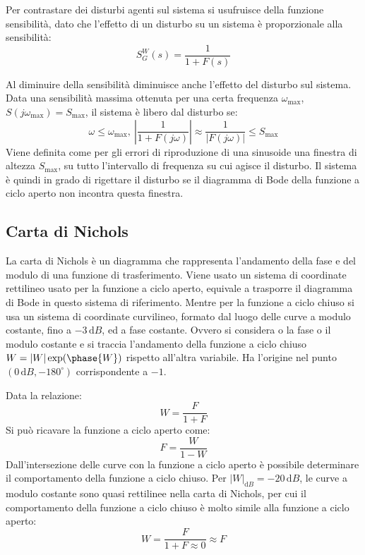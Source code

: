 \documentclass{article}
\numberwithin{equation}{subsection}
\newcommand{\df}{\mathrm{d}}
\begin{document}
 
Per contrastare dei disturbi agenti sul sistema si usufruisce della funzione sensibilità, dato che l'effetto di un disturbo su un sistema è proporzionale alla sensibilità:
\begin{equation*}
    S^W_G(s)=\displaystyle\frac{1}{1+F(s)}
\end{equation*}

Al diminuire della sensibilità diminuisce anche l'effetto del disturbo sul sistema. Data una sensibilità massima ottenuta per una certa frequenza $\omega_{\max}$, 
$S(j\omega_{\max})=S_{\max}$, il sistema è libero dal disturbo se: 
\begin{equation*}
    \omega\leq\omega_{\max},\:\displaystyle\left|\frac{1}{1+F(j\omega)}\right|\approx\frac{1}{|F(j\omega)|}\leq S_{\max}
\end{equation*}
Viene definita come per gli errori di riproduzione di una sinusoide una finestra di altezza $S_{\max}$, su tutto l'intervallo di frequenza su cui agisce il disturbo. Il sistema 
è quindi in grado di rigettare il disturbo se il diagramma di Bode della funzione a ciclo aperto non incontra questa finestra. 

\subsection{Carta di Nichols}

La carta di Nichols è un diagramma che rappresenta l'andamento della fase e del modulo di una funzione di trasferimento. Viene usato un sistema di coordinate rettilineo 
usato per la funzione a ciclo aperto, equivale a trasporre il diagramma di Bode in questo sistema di riferimento. Mentre per la funzione 
a ciclo chiuso si usa un sistema di coordinate curvilineo, formato dal luogo delle curve a modulo costante, fino a $-3\,\df B$, ed a fase costante. Ovvero si considera o la fase 
o il modulo costante e si traccia l'andamento della funzione a ciclo chiuso $W=|W|\exp({\phase{W}})$ rispetto all'altra variabile. Ha l'origine nel punto 
$(0\,\df B,-180^{\circ})$ corrispondente a $-1$. 


Data la relazione:
\begin{equation*}
    W=\displaystyle\frac{F}{1+F}
\end{equation*}
Si può ricavare la funzione a ciclo aperto come: 
\begin{equation*}
    F=\displaystyle\frac{W}{1-W}
\end{equation*}
Dall'intersezione delle curve con 
la funzione a ciclo aperto è possibile determinare il comportamento della funzione a ciclo chiuso. Per $|W|_{\df B}=-20\,\df B$, le curve a modulo costante sono quasi rettilinee nella 
carta di Nichols, per cui il comportamento della funzione a ciclo chiuso è molto simile alla funzione a ciclo aperto: 
\begin{equation*}
    W=\displaystyle\frac{F}{1+F\approx0}\approx F
\end{equation*}
\end{document}
